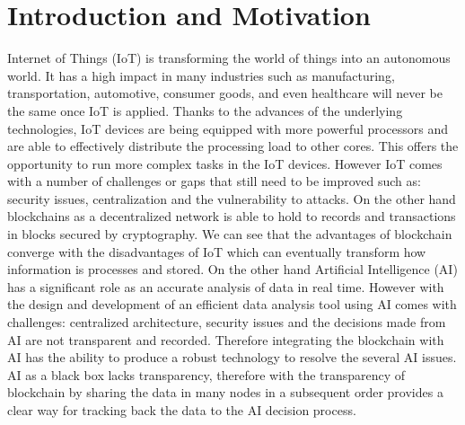 \chapter{Introduction and Motivation}
\label{thesis:introduction}



Internet of Things (IoT) is transforming the world of things into an autonomous world. It has a high impact in many industries such as manufacturing, transportation, automotive, consumer goods, and even healthcare will never be the same
once IoT is applied. Thanks to the advances of the underlying technologies, IoT devices are being equipped with more powerful processors and are able to effectively distribute the processing load to other cores. This offers the opportunity to run more complex tasks in the IoT devices. 
However IoT comes with a number of challenges or gaps  that still need to be improved such as: security issues, centralization and the vulnerability to attacks. 
On the other hand blockchains as a decentralized network is able to hold to records and transactions in blocks secured by cryptography. We can see that the advantages of blockchain converge with the disadvantages of IoT which can eventually transform how information is processes and stored. On the other hand Artificial Intelligence (AI) has a significant role as an accurate analysis of data in real time. However with the design and development of an efficient data analysis tool  using AI comes with challenges: centralized architecture, security issues and the decisions made from AI are not transparent and recorded. Therefore integrating the blockchain with AI has the ability to produce a robust technology to resolve the several AI issues. AI as a black box lacks transparency, therefore with the transparency of blockchain by sharing the data in many nodes in a subsequent order provides a clear way for tracking back the data to the AI decision process.   

